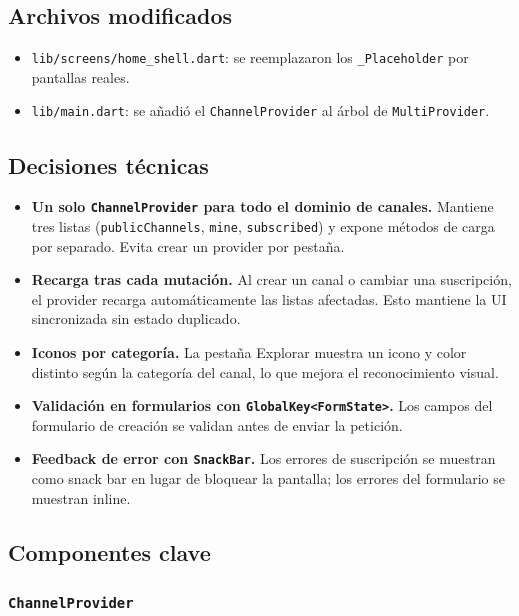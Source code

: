 \subsection{Archivos modificados}

\begin{itemize}[leftmargin=*]
  \item \texttt{lib/screens/home\_shell.dart}: se reemplazaron los \texttt{\_Placeholder} por pantallas reales.
  \item \texttt{lib/main.dart}: se añadió el \texttt{ChannelProvider} al árbol de \texttt{MultiProvider}.
\end{itemize}

\subsection{Decisiones técnicas}

\begin{itemize}[leftmargin=*]
  \item \textbf{Un solo \texttt{ChannelProvider} para todo el dominio de canales.} Mantiene tres listas (\texttt{publicChannels}, \texttt{mine}, \texttt{subscribed}) y expone métodos de carga por separado. Evita crear un provider por pestaña.
  \item \textbf{Recarga tras cada mutación.} Al crear un canal o cambiar una suscripción, el provider recarga automáticamente las listas afectadas. Esto mantiene la UI sincronizada sin estado duplicado.
  \item \textbf{Iconos por categoría.} La pestaña Explorar muestra un icono y color distinto según la categoría del canal, lo que mejora el reconocimiento visual.
  \item \textbf{Validación en formularios con \texttt{GlobalKey<FormState>}.} Los campos del formulario de creación se validan antes de enviar la petición.
  \item \textbf{Feedback de error con \texttt{SnackBar}.} Los errores de suscripción se muestran como snack bar en lugar de bloquear la pantalla; los errores del formulario se muestran inline.
\end{itemize}

\subsection{Componentes clave}

\subsubsection{\texttt{ChannelProvider}}

